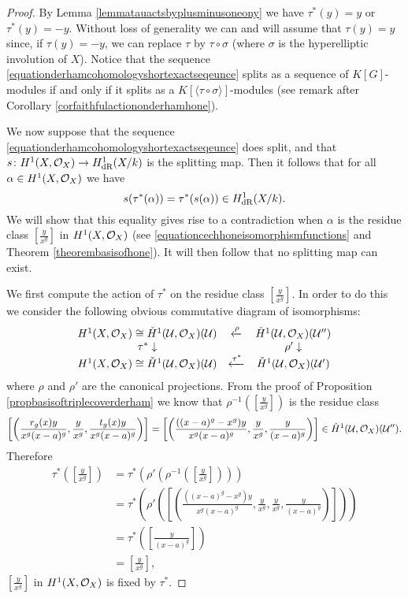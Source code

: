     \begin{proof}
    By Lemma \ref{lemmatauactsbyplusminusoneony} we have $\tau^*(y) = y$ or $\tau^*(y) = -y$.
    Without loss of generality we can and will assume that $\tau(y) = y$ since, if $\tau(y) = -y$, we can replace $\tau$ by $\tau \circ \sigma$ (where $\sigma$ is the hyperelliptic involution of $X$).
    Notice that the sequence \eqref{equationderhamcohomologyshortexactseqeunce} splits as a sequence of $K[G]$-modules if and only if it splits as a  $K[\langle \tau \circ \sigma \rangle]$-modules (see remark after Corollary \ref{corfaithfulactiononderhamhone}).
    
    We now suppose that the sequence \eqref{equationderhamcohomologyshortexactseqeunce} does split, and that $s \colon H^1(X,\mathcal{O}_X) \rightarrow H_{\text {dR}}^1(X/k)$ is the splitting map.
    Then it follows that for all $\alpha \in H^1(X,\mathcal{O}_X)$ we have
        \begin{equation}\label{equationcommutativityoftauandsplittingmap}
        s(\tau^*(\alpha)) = \tau^*(s(\alpha)) \in H_{\text {dR}}^1(X/k).
        \end{equation}
    We will show that this equality gives rise to a contradiction when $\alpha$ is the residue class $\left[ \frac{y}{x^g}\right]$ in $H^1(X,\mathcal{O}_X)$ (see \eqref{equationcechhoneisomorphismfunctions} and Theorem \ref{theorembasisofhone}).  
    It will then follow that no splitting map can exist.

    We first compute the action of $\tau^*$ on the residue class $\left[\frac{y}{x^g}\right]$.
    In order to do this we consider the following obvious commutative diagram of isomorphisms:
        \[
        \begin{array}{cccc}
        H^1(X,\mathcal{O}_X) \cong \check{H}^1(\mathcal U,\mathcal O_X)({\mathcal U})  & \xleftarrow{\rho} & \check{H}^1(\mathcal U,\mathcal O_X)({\mathcal U}'')  \\
                \tau^*\downarrow & ~ & \rho'\downarrow  \\
        H^1(X,\mathcal{O}_X) \cong \check{H}^1(\mathcal U,\mathcal O_X)({\mathcal U})  & \xleftarrow{\tau^*} & \check{H}^1(\mathcal U,\mathcal O_X)({\mathcal U}')
        \end{array}
        \]
    where $\rho$ and $\rho'$ are the canonical projections.
    From the proof of Proposition \ref{propbasisoftriplecoverderham} we know that $\rho^{-1} \left(\left[\frac{y}{x^g}\right]\right)$ is the residue class 
        \[
        \left[ \left( \frac{r_g(x)y}{x^g(x-a)^g}, \frac{y}{x^g}, \frac{t_g(x)y}{x^g(x-a)^g} \right)\right] = \left[ \left( \frac{((x-a)^g-x^g)y}{x^g(x-a)^g}, \frac{y}{x^g}, \frac{y}{(x-a)^g} \right) \right] \in \check{H}^1(\mathcal U,\mathcal O_X)({\mathcal U}'').
        \]  
    Therefore 
        \begin{align*}
        \tau^* \left( \left[ \frac{y}{x^g} \right] \right)  & = \tau^* \left( \rho' \left(\rho^{-1}\left(\left[\frac{y}{x^g}\right]\right)\right)\right) \\
        & = \tau^*\left( \rho' \left( \left[ \left( \frac{((x-a)^g-x^g)y}{x^g(x-a)^g}, \frac{y}{x^g}, \frac{y}{x^g}, \frac{y}{(x-a)^g} \right) \right] \right) \right) \\
        & = \tau^*\left( \left[ \frac{y}{(x-a)^g} \right] \right) \\
        & = \left[ \frac{y}{x^g} \right],
        \end{align*}
    \ie $\left[ \frac{y}{x^g} \right]$ in $H^1(X,\mathcal{O}_X)$ is fixed by $\tau^*$.


\end{proof}
